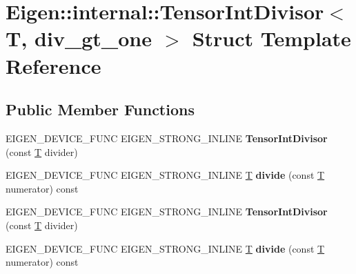 \hypertarget{struct_eigen_1_1internal_1_1_tensor_int_divisor}{}\section{Eigen\+:\+:internal\+:\+:Tensor\+Int\+Divisor$<$ T, div\+\_\+gt\+\_\+one $>$ Struct Template Reference}
\label{struct_eigen_1_1internal_1_1_tensor_int_divisor}
\subsection*{Public Member Functions}
\begin{DoxyCompactItemize}
\item 
\mbox{\label{struct_eigen_1_1internal_1_1_tensor_int_divisor_a5904e160c4235be7ad167ad5116a51bd}} 
E\+I\+G\+E\+N\+\_\+\+D\+E\+V\+I\+C\+E\+\_\+\+F\+U\+NC E\+I\+G\+E\+N\+\_\+\+S\+T\+R\+O\+N\+G\+\_\+\+I\+N\+L\+I\+NE {\bfseries Tensor\+Int\+Divisor} (const \hyperlink{group___sparse_core___module}{T} divider)
\item 
\mbox{\label{struct_eigen_1_1internal_1_1_tensor_int_divisor_acf40e2247dd761488eec6c3871b228a4}} 
E\+I\+G\+E\+N\+\_\+\+D\+E\+V\+I\+C\+E\+\_\+\+F\+U\+NC E\+I\+G\+E\+N\+\_\+\+S\+T\+R\+O\+N\+G\+\_\+\+I\+N\+L\+I\+NE \hyperlink{group___sparse_core___module}{T} {\bfseries divide} (const \hyperlink{group___sparse_core___module}{T} numerator) const
\item 
\mbox{\label{struct_eigen_1_1internal_1_1_tensor_int_divisor_a5904e160c4235be7ad167ad5116a51bd}} 
E\+I\+G\+E\+N\+\_\+\+D\+E\+V\+I\+C\+E\+\_\+\+F\+U\+NC E\+I\+G\+E\+N\+\_\+\+S\+T\+R\+O\+N\+G\+\_\+\+I\+N\+L\+I\+NE {\bfseries Tensor\+Int\+Divisor} (const \hyperlink{group___sparse_core___module}{T} divider)
\item 
\mbox{\label{struct_eigen_1_1internal_1_1_tensor_int_divisor_acf40e2247dd761488eec6c3871b228a4}} 
E\+I\+G\+E\+N\+\_\+\+D\+E\+V\+I\+C\+E\+\_\+\+F\+U\+NC E\+I\+G\+E\+N\+\_\+\+S\+T\+R\+O\+N\+G\+\_\+\+I\+N\+L\+I\+NE \hyperlink{group___sparse_core___module}{T} {\bfseries divide} (const \hyperlink{group___sparse_core___module}{T} numerator) const
\end{DoxyCompactItemize}


